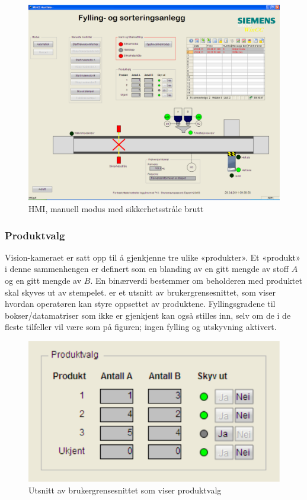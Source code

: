 \documentclass[Visionprosjekt.tex]{subfiles}
\begin{document}
\begin{figure}[ht]
	\centering
		\includegraphics[width=1.0\textwidth]{bilder/strale_brutt}
	\caption{HMI, manuell modus med sikkerhetsstråle brutt}
	\label{fig:strale_brutt}
\end{figure}





\subsubsection{Produktvalg}

Vision-kameraet er satt opp til å gjenkjenne tre ulike «produkter». Et «produkt» i denne sammenhengen er definert som  en blanding av en gitt mengde  av stoff $A$ og en gitt mengde av $B$. En binærverdi  bestemmer om beholderen med produktet skal skyves ut av stempelet.  er et utsnitt av brukergrensesnittet, som viser hvordan operatøren kan styre oppsettet av  produktene. Fyllingsgradene til bokser/datamatriser som ikke er gjenkjent kan også stilles inn, selv om de i de fleste tilfeller vil være som på figuren; ingen fylling og utskyvning aktivert.

\begin{figure}[ht]
	\centering
		\includegraphics[scale=0.8]{bilder/produktvalg.pdf}
	\caption{Utsnitt av brukergrensesnittet som viser produktvalg}
	\label{fig:produktvalg}
\end{figure}
\end{document}

